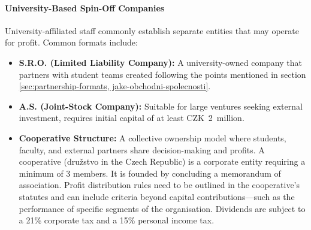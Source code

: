 \paragraph{University-Based Spin-Off Companies}
University-affiliated staff commonly establish separate entities that may operate for profit. Common formats include:
\begin{itemize}
    \item \textbf{S.R.O. (Limited Liability Company):} A university-owned company that partners with student teams created following the points mentioned in section \ref{sec:partnership-formats, jake-obchodni-spolecnosti}.
    \item \textbf{A.S. (Joint-Stock Company):} Suitable for large ventures seeking external investment, requires initial capital of at least CZK~2~million. \cite{jake-obchodni-spolecnosti}
    \item \textbf{Cooperative Structure:} A collective ownership model where students, faculty, and external partners share decision-making and profits. A cooperative (družstvo in the Czech Republic) is a corporate entity requiring a minimum of 3 members. It is founded by concluding a memorandum of association. Profit distribution rules need to be outlined in the cooperative’s statutes and can include criteria beyond capital contributions---such as the performance of specific segments of the organisation. Dividends are subject to a 21\% corporate tax and a 15\% personal income tax. \cite{preuss-coop, team-coop, businessinfo-coop}
\end{itemize}
